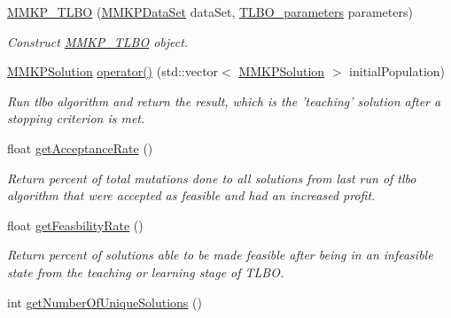 \begin{DoxyCompactItemize}
\item 
\hyperlink{class_m_m_k_p___t_l_b_o_a889c073268b283872a9601616bfcf6b0}{M\+M\+K\+P\+\_\+\+T\+L\+B\+O} (\hyperlink{class_m_m_k_p_data_set}{M\+M\+K\+P\+Data\+Set} data\+Set, \hyperlink{struct_t_l_b_o__parameters}{T\+L\+B\+O\+\_\+parameters} parameters)
\begin{DoxyCompactList}\small\item\em Construct \hyperlink{class_m_m_k_p___t_l_b_o}{M\+M\+K\+P\+\_\+\+T\+L\+B\+O} object. \end{DoxyCompactList}\item 
\hypertarget{class_m_m_k_p___t_l_b_o_a095c049b8f168b34f2287a9cdbe5cd71}{\hyperlink{class_m_m_k_p_solution}{M\+M\+K\+P\+Solution} \hyperlink{class_m_m_k_p___t_l_b_o_a095c049b8f168b34f2287a9cdbe5cd71}{operator()} (std\+::vector$<$ \hyperlink{class_m_m_k_p_solution}{M\+M\+K\+P\+Solution} $>$ initial\+Population)}\label{class_m_m_k_p___t_l_b_o_a095c049b8f168b34f2287a9cdbe5cd71}

\begin{DoxyCompactList}\small\item\em Run tlbo algorithm and return the result, which is the 'teaching' solution after a stopping criterion is met. \end{DoxyCompactList}\item 
\hypertarget{class_m_m_k_p___t_l_b_o_aaf6f0fddc9df079743b0bd2ca8414713}{float \hyperlink{class_m_m_k_p___t_l_b_o_aaf6f0fddc9df079743b0bd2ca8414713}{get\+Acceptance\+Rate} ()}\label{class_m_m_k_p___t_l_b_o_aaf6f0fddc9df079743b0bd2ca8414713}

\begin{DoxyCompactList}\small\item\em Return percent of total mutations done to all solutions from last run of tlbo algorithm that were accepted as feasible and had an increased profit. \end{DoxyCompactList}\item 
\hypertarget{class_m_m_k_p___t_l_b_o_a5fc9b7ea967e88f473063dc91fe45b5c}{float \hyperlink{class_m_m_k_p___t_l_b_o_a5fc9b7ea967e88f473063dc91fe45b5c}{get\+Feasbility\+Rate} ()}\label{class_m_m_k_p___t_l_b_o_a5fc9b7ea967e88f473063dc91fe45b5c}

\begin{DoxyCompactList}\small\item\em Return percent of solutions able to be made feasible after being in an infeasible state from the teaching or learning stage of T\+L\+B\+O. \end{DoxyCompactList}\item 
\hypertarget{class_m_m_k_p___t_l_b_o_af376e7f0515c68e0306028bc724ccb19}{int \hyperlink{class_m_m_k_p___t_l_b_o_af376e7f0515c68e0306028bc724ccb19}{get\+Number\+Of\+Unique\+Solutions} ()}\label{class_m_m_k_p___t_l_b_o_af376e7f0515c68e0306028bc724ccb19}


\end{DoxyCompactItemize}
